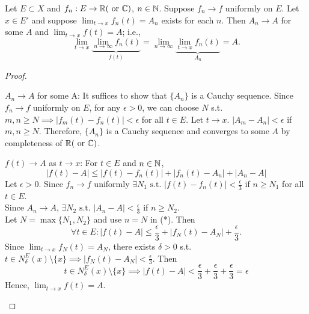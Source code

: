 \begin{thm}[11]
	Let $E \subset X$ and $f_{n}: E \to \mathbb{R} (\text{ or } \mathbb{C})$, $n \in \mathbb{N}$.
	Suppose $f_{n}\to f$ uniformly on $E$. Let $x \in E'$ and suppose $\lim_{t\to x}{f_{n}(t)}=A_{n}$ exists for each $n$.
	Then $A_{n}\to A$ for some $A$ and $\lim_{t\to x}{f(t)}=A$; i.e.,
	\[
		\lim_{t\to x}{\underbrace{\lim_{n\to \infty}{f_{n}(t)}}_{f(t)}}=\lim_{n\to \infty}{\underbrace{\lim_{t\to x}{f_{n}(t)}}_{A_n}}=A
		.\]
	\begin{proof}
		\begin{describe}
			\item[$A_n \to A$ for some A:]
			It suffices to show that $\{A_{n}\}$ is a Cauchy sequence.
			Since $f_n\to f$ uniformly on $E$, for any $\epsilon>0$, we can choose $N$ s.t. $m,n\ge N \implies \left|f_{m}(t)-f_{n}(t)\right| < \epsilon$ for all $t \in E$.
			Let $t\to x$. $\left|A_{m}-A_{n}\right| < \epsilon$ if $m,n\ge N$. Therefore, $\{A_{n}\}$ is a Cauchy sequence and converges to some $A$ by completeness of $\mathbb{R}(\text{ or } \mathbb{C})$.
			\item[$f(t)\to A$ as $t\to x$:]
			For $t \in E$ and $n \in \mathbb{N}$,
			\begin{equation*}
				\left|f(t)-A\right| \le \left|f(t)-f_{n}(t)\right| + \left|f_{n}(t)-A_n\right|  + \left|A_n -A\right| \tag{*}
			\end{equation*}
			Let $\epsilon>0$. Since $f_{n}\to f$ uniformly $\exists{N_1} \text{ s.t. } \left|f(t)-f_{n}(t)\right| <\frac{\epsilon}{3}$ if $n\ge N_1$ for all $t \in E$.\\
			Since $A_{n}\to A$, $\exists{N_2} \text{ s.t. } \left|A_{n}-A\right| < \frac{\epsilon}{3}$ if $n\ge N_2$.
			\\
			Let $N=\max\{N_1,N_2\}$ and use $n=N$ in (*).
			Then
			\[
				\forall{t \in E}: \left|f(t)-A\right|\le  \frac{\epsilon}{3}+\left|f_N(t)-A_N\right| +\frac{\epsilon}{3}
				.\]
			Since $\lim_{t\to x}{f_N(t)}=A_N$, there exists $\delta>0$ s.t. $t \in N_{\delta}^{E}(x)\setminus \{x\}  \implies \left|f_N(t)-A_{N}\right| < \frac{\epsilon}{3}$.
			Then
			\[
				t \in N_{\delta}^{E}(x)\setminus \{x\}  \implies \left|f(t)-A\right|< \frac{\epsilon}{3}+\frac{\epsilon}{3}+\frac{\epsilon}{3}=\epsilon
			\]
			Hence, $\lim_{t\to x}{f(t)}=A$.
		\end{describe}
	\end{proof}
\end{thm}
